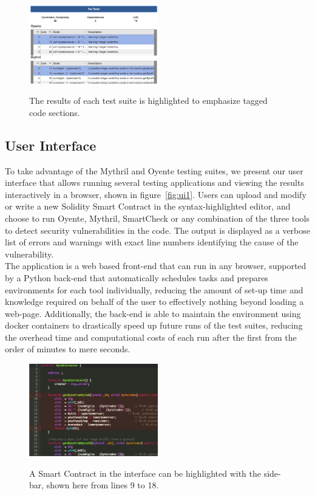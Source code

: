 \begin{figure}
\begin{center}
  \includegraphics[width=0.5\textwidth]{img/ui2_2.jpg}
  \label{fig:ui2_2}
  \caption{The results of each test suite is highlighted to emphasize tagged code sections.}
\end{center}
\end{figure}

\subsection{User Interface}

To take advantage of the Mythril and Oyente testing suites, we present our user interface that allows running several testing applications and viewing the results interactively in a browser, shown in figure~\ref{fig:ui1}. Users can upload and modify or write a new Solidity Smart Contract in the syntax-highlighted editor, and choose to run Oyente, Mythril, SmartCheck or any combination of the three tools to detect security vulnerabilities in the code. The output is displayed as a verbose list of errors and warnings with exact line numbers identifying the cause of the vulnerability. \\

The application is a web based front-end that can run in any browser, supported by a Python back-end that automatically schedules tasks and prepares environments for each tool individually, reducing the amount of set-up time and knowledge required on behalf of the user to effectively nothing beyond loading a web-page. Additionally, the back-end is able to maintain the environment using docker containers to drastically speed up future runs of the test suites, reducing the overhead time and computational costs of each run after the first from the order of minutes to mere seconds. \\

\begin{figure}
\begin{center}
  \includegraphics[width=0.5\textwidth]{img/ui2_1.jpg}
  \label{fig:ui2_1}
  \caption{A Smart Contract in the interface can be highlighted with the side-bar, shown here from lines 9 to 18.}
\end{center}
\end{figure}

